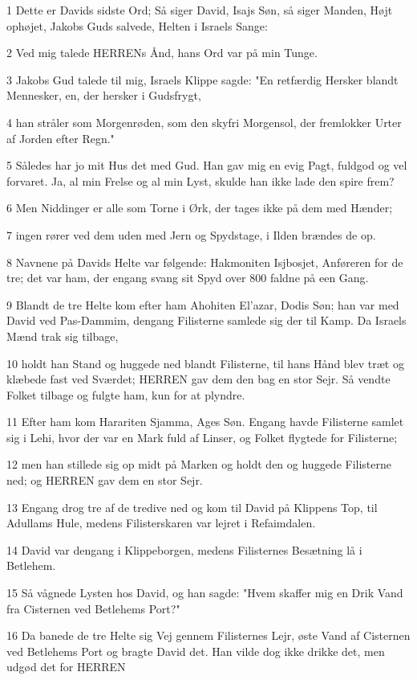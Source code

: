 \par 1 Dette er Davids sidste Ord; Så siger David, Isajs Søn, så siger Manden, Højt ophøjet, Jakobs Guds salvede, Helten i Israels Sange:
\par 2 Ved mig talede HERRENs Ånd, hans Ord var på min Tunge.
\par 3 Jakobs Gud talede til mig, Israels Klippe sagde: "En retfærdig Hersker blandt Mennesker, en, der hersker i Gudsfrygt,
\par 4 han stråler som Morgenrøden, som den skyfri Morgensol, der fremlokker Urter af Jorden efter Regn."
\par 5 Således har jo mit Hus det med Gud. Han gav mig en evig Pagt, fuldgod og vel forvaret. Ja, al min Frelse og al min Lyst, skulde han ikke lade den spire frem?
\par 6 Men Niddinger er alle som Torne i Ørk, der tages ikke på dem med Hænder;
\par 7 ingen rører ved dem uden med Jern og Spydstage, i Ilden brændes de op.
\par 8 Navnene på Davids Helte var følgende: Hakmoniten Isjbosjet, Anføreren for de tre; det var ham, der engang svang sit Spyd over 800 faldne på een Gang.
\par 9 Blandt de tre Helte kom efter ham Ahohiten El'azar, Dodis Søn; han var med David ved Pas-Dammim, dengang Filisterne samlede sig der til Kamp. Da Israels Mænd trak sig tilbage,
\par 10 holdt han Stand og huggede ned blandt Filisterne, til hans Hånd blev træt og klæbede fast ved Sværdet; HERREN gav dem den bag en stor Sejr. Så vendte Folket tilbage og fulgte ham, kun for at plyndre.
\par 11 Efter ham kom Harariten Sjamma, Ages Søn. Engang havde Filisterne samlet sig i Lehi, hvor der var en Mark fuld af Linser, og Folket flygtede for Filisterne;
\par 12 men han stillede sig op midt på Marken og holdt den og huggede Filisterne ned; og HERREN gav dem en stor Sejr.
\par 13 Engang drog tre af de tredive ned og kom til David på Klippens Top, til Adullams Hule, medens Filisterskaren var lejret i Refaimdalen.
\par 14 David var dengang i Klippeborgen, medens Filisternes Besætning lå i Betlehem.
\par 15 Så vågnede Lysten hos David, og han sagde: "Hvem skaffer mig en Drik Vand fra Cisternen ved Betlehems Port?"
\par 16 Da banede de tre Helte sig Vej gennem Filisternes Lejr, øste Vand af Cisternen ved Betlehems Port og bragte David det. Han vilde dog ikke drikke det, men udgød det for HERREN
